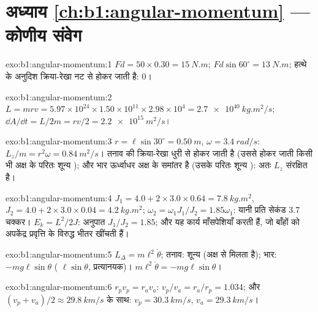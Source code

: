 \section*{अध्याय \ref{ch:b1:angular-momentum} --- कोणीय संवेग}

\begin{solution}{exo:b1:angular-momentum:1}
$Fd = 50 \times 0.30 = \qty{15}{N.m}$; $Fd\sin 60^\circ = \qty{13}{N.m}$;
हत्थे के अनुदिश क्रिया-रेखा नट से होकर जाती है: $0$।
\end{solution}

\begin{solution}{exo:b1:angular-momentum:2}
$L = mrv = 5.97\times10^{24} \times 1.50\times10^{11} \times 2.98\times10^4 =
\qty{2.7e40}{kg.m^2/s}$; $\dd A/\dd t = L/2m = rv/2 = \qty{2.2e15}{m^2/s}$।
\end{solution}

\begin{solution}{exo:b1:angular-momentum:3}
$r = \ell\sin 30^\circ = \qty{0.50}{m}$, $\omega = \qty{3.4}{rad/s}$:
$L_z/m = r^2\omega = \qty{0.84}{m^2/s}$। तनाव की क्रिया-रेखा धुरी से होकर
जाती है (उससे होकर जाती किसी भी अक्ष के परितः शून्य ); और भार
ऊर्ध्वाधर अक्ष के समांतर है (उसके परितः शून्य ): अतः $L_z$
संरक्षित है।
\end{solution}

\begin{solution}{exo:b1:angular-momentum:4}
$J_1 = 4.0 + 2 \times 3.0 \times 0.64 = \qty{7.8}{kg.m^2}$, $J_2 = 4.0 +
2 \times 3.0 \times 0.04 = \qty{4.2}{kg.m^2}$; $\omega_2 = \omega_1J_1/J_2 =
1.85\omega_1$: यानी प्रति सेकंड \qty{3.7}{} चक्कर। $E_k = L^2/2J$: अनुपात
$J_1/J_2 = 1.85$; और यह कार्य माँसपेशियाँ करती हैं, जो बाँहों को अपकेंद्र
प्रवृत्ति के विरुद्ध भीतर खींचती हैं।
\end{solution}

\begin{solution}{exo:b1:angular-momentum:5}
$L_\Delta = m\ell^2\dot\theta$; तनाव: शून्य  (अक्ष से मिलता है);
भार: $-mg\ell\sin\theta$ ( $\ell\sin\theta$, प्रत्यानयक)।
$m\ell^2\ddot\theta = -mg\ell\sin\theta$।
\end{solution}

\begin{solution}{exo:b1:angular-momentum:6}
$r_pv_p = r_av_a$: $v_p/v_a = r_a/r_p = 1.034$; और $(v_p + v_a)/2 \approx
\qty{29.8}{km/s}$ के साथ: $v_p = \qty{30.3}{km/s}$, $v_a = \qty{29.3}{km/s}$।
\end{solution}

